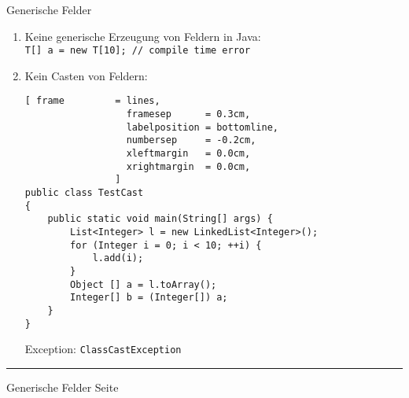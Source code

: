 \documentclass{slides}
\newcounter{mypage}
\begin{document}

\begin{slide}{}
\normalsize

\begin{center}
Generische Felder
\end{center}
\vspace*{0.5cm}

\footnotesize

\begin{enumerate}
\item Keine generische Erzeugung von Feldern in Java:
      \\[0.2cm]
      \hspace*{1.3cm}
      \texttt{T[] a = new T[10];  // compile time error} 

\item Kein Casten von Feldern:
\begin{Verbatim}[ frame         = lines, 
                  framesep      = 0.3cm, 
                  labelposition = bottomline,
                  numbersep     = -0.2cm,
                  xleftmargin   = 0.0cm,
                  xrightmargin  = 0.0cm,
                ]
public class TestCast 
{ 
    public static void main(String[] args) {
        List<Integer> l = new LinkedList<Integer>();
        for (Integer i = 0; i < 10; ++i) {
            l.add(i);
        }
        Object [] a = l.toArray();
        Integer[] b = (Integer[]) a;
    }
}
\end{Verbatim}
Exception: \texttt{ClassCastException}
\end{enumerate}

\vspace*{\fill}
\tiny \addtocounter{mypage}{1}
\rule{17cm}{1mm}
Generische Felder \hspace*{\fill} Seite 
\end{slide}


\end{document}
